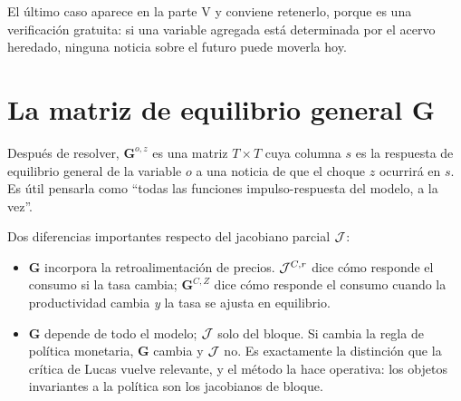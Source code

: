 El último caso aparece en la parte V y conviene retenerlo, porque es una
verificación gratuita: si una variable agregada está determinada por el acervo
heredado, ninguna noticia sobre el futuro puede moverla hoy.

\section{La matriz de equilibrio general $\mathbf{G}$}

Después de resolver, $\mathbf{G}^{o,z}$ es una matriz $T\times T$ cuya columna
$s$ es la respuesta de equilibrio general de la variable $o$ a una noticia de que
el choque $z$ ocurrirá en $s$. Es útil pensarla como ``todas las funciones
impulso-respuesta del modelo, a la vez''.

Dos diferencias importantes respecto del jacobiano parcial $\mathcal{J}$:

\begin{itemize}[leftmargin=1.4em]
\item $\mathbf{G}$ incorpora la retroalimentación de precios. $\mathcal{J}^{C,r}$ dice
cómo responde el consumo si la tasa cambia; $\mathbf{G}^{C,Z}$ dice cómo responde
el consumo cuando la productividad cambia \emph{y} la tasa se ajusta en
equilibrio.
\item $\mathbf{G}$ depende de todo el modelo; $\mathcal{J}$ solo del bloque. Si cambia la
regla de política monetaria, $\mathbf{G}$ cambia y $\mathcal{J}$ no. Es exactamente la
distinción que la crítica de Lucas vuelve relevante, y el método la hace
operativa: los objetos invariantes a la política son los jacobianos de bloque.
\end{itemize}
